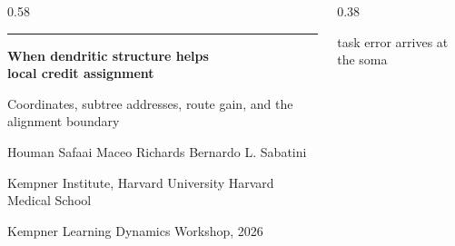 
\begin{frame}[plain]
  \vspace{0.48cm}
  \begin{columns}[c,onlytextwidth]
    \begin{column}{0.58\textwidth}
      {\color{Shunt}\rule{1.15cm}{1.8pt}}\par
      \vspace{0.34cm}
      {\fontsize{25}{29}\selectfont\bfseries
       When dendritic structure helps\\[0.05cm]
       local credit assignment\par}
      \vspace{0.28cm}
      {\normalsize\color{Mute}
       Coordinates, subtree addresses, route gain, and the alignment
       boundary\par}
      \vspace{0.56cm}
      {\small Houman Safaai\enspace\textperiodcentered\enspace
       Maceo Richards\enspace\textperiodcentered\enspace
       Bernardo L. Sabatini\par}
      \vspace{0.10cm}
      {\footnotesize\color{Mute}Kempner Institute, Harvard University
       \enspace\textperiodcentered\enspace Harvard Medical School\par}
      \vspace{0.24cm}
      {\footnotesize\color{Mute}Kempner Learning Dynamics Workshop, 2026\par}
    \end{column}
    \begin{column}{0.38\textwidth}
      \centering
      \CreditTree[mode=address,K=4,scale=0.98,
        stagelabel={one neuron, multiple candidate credit routes}]
      \vspace{0.06cm}
      {\scriptsize\color{Mute}task error arrives at the soma\par}
    \end{column}
  \end{columns}
\end{frame}

